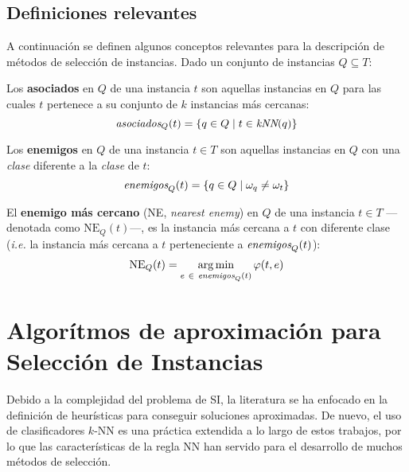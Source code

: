 \subsection{Definiciones relevantes}

A continuación se definen algunos conceptos relevantes para la descripción de métodos de selección de instancias. Dado un conjunto de instancias $Q \subseteq T$:\\

\begin{definicion}
Los \textbf{asociados} en $Q$ de una instancia $t$ son aquellas instancias en $Q$ para las cuales $t$ pertenece a su conjunto de $k$ instancias más cercanas:
\begin{equation}
\emph{asociados}_Q(t) = \left\lbrace q \in Q \mid t\in \emph{kNN}(q) \right\rbrace
\end{equation}
\end{definicion}

\begin{definicion}
Los \textbf{enemigos} en $Q$ de una instancia $t \in T$ son aquellas instancias en $Q$ con una \emph{clase} diferente a la \emph{clase} de $t$:
\begin{equation}
\emph{enemigos}_Q(t) = \left\lbrace q \in Q \mid \omega_{q} \neq \omega_{t} \right\rbrace
\end{equation}
\end{definicion}

\begin{definicion}
El \textbf{enemigo más cercano} (NE, \emph{nearest enemy}) en $Q$ de una instancia $t \in T$ ---denotada como $\mathrm{NE}_Q(t)$---, es la instancia más cercana a $t$ con diferente clase (\emph{i.e.} la instancia más cercana a $t$ perteneciente a $\emph{enemigos}_Q(t)$):
\begin{equation}
\mathrm{NE}_Q(t) = \operatorname*{arg\,min}_{e\ \in\ \emph{enemigos}_Q(t)} \varphi(t,e)
\end{equation}
\end{definicion}

\section{Algorítmos de aproximación para Selección de Instancias}
\label{alg-aprox-si}

Debido a la complejidad del problema de SI, la literatura se ha enfocado en la definición de heurísticas para conseguir soluciones aproximadas. De nuevo, el uso de clasificadores $k$-NN es una práctica extendida a lo largo de estos trabajos, por lo que las características de la regla NN han servido para el desarrollo de muchos métodos de selección.%

